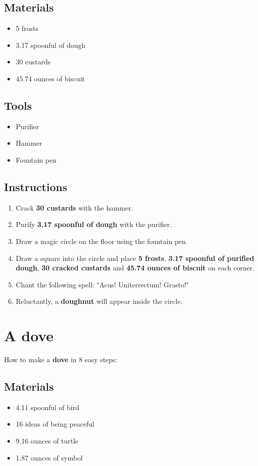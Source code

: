 \documentclass{article}
\begin{document}
\subsection{Materials}\begin{itemize}
\item 
5 frosts
\item 
3.17 spoonful of dough
\item 
30 custards
\item 
45.74 ounces of biscuit
\end{itemize}
\subsection{Tools}\begin{itemize}
\item 
Purifier
\item 
Hammer
\item 
Fountain pen
\end{itemize}
\subsection{Instructions}\begin{enumerate}
\item 
Crack \textbf{30 custards} with the hammer.
\item 
Purify \textbf{3.17 spoonful of dough} with the purifier.
\item 
Draw a magic circle on the floor using the fountain pen.
\item 
Draw a square into the circle and place \textbf{5 frosts}, \textbf{3.17 spoonful of purified dough}, \textbf{30 cracked custards} and \textbf{45.74 ounces of biscuit} on each corner.
\item 
Chant the following spell: "Acus! Uniterrectum! Grasto!"
\item 
Reluctantly, a \textbf{doughnut} will appear inside the circle.
\end{enumerate}
\newpage
\section{A dove}How to make a \textbf{dove} in 8 easy steps:

\subsection{Materials}\begin{itemize}
\item 
4.11 spoonful of bird
\item 
16 ideas of being peaceful
\item 
9.16 ounces of turtle
\item 
1.87 ounces of symbol
\end{itemize}
\end{document}
